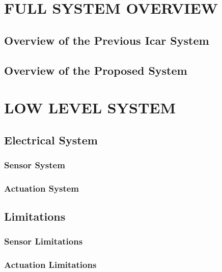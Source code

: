 

\chapter{FULL SYSTEM OVERVIEW}
\label{sec:chap3_metodologi}
\section*{ } 

\section{Overview of the Previous Icar System} 
\OverviewofthePreviousIcarSystem
\section{Overview of the Proposed System}
\OverviewoftheProposedSystem

\chapter{LOW LEVEL SYSTEM}
\label{sec:chap3_metodologi2}
\section*{ } 

\section{Electrical System}
\ElectricalSystem
\subsection{Sensor System}
\SensorSystem
\subsection{Actuation System}
\ActuationSystem

\section{Limitations}
\Limitations
\subsection{Sensor Limitations}
\SensorLimitations
\subsection{Actuation Limitations}
\ActuationLimitations

